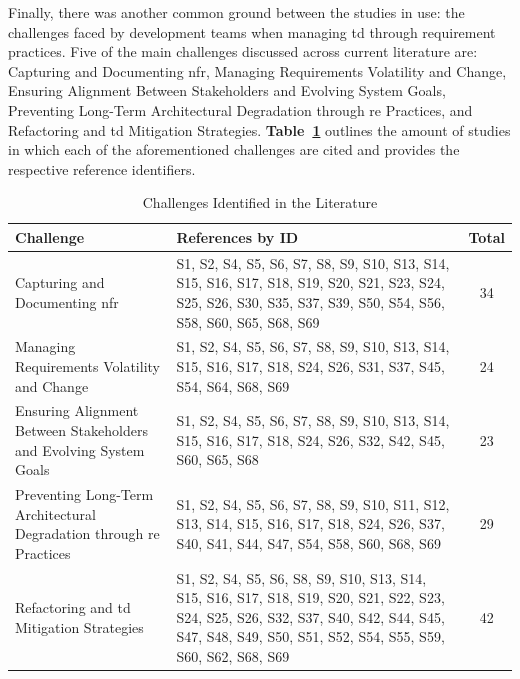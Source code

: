 \documentclass[12pt,reqno, twoside]{amsbook}
\theoremstyle{plain}
\numberwithin{equation}{chapter}
\newcommand{\tabref}[1]{\textbf{Table~\ref{#1}}}
\numberwithin{section}{chapter}
\begin{document}
\noindent Finally, there was another common ground between the studies in use: the challenges faced by development teams when managing \gls{td} through requirement practices. Five of the main challenges discussed across current literature are: Capturing and Documenting \gls{nfr}, Managing Requirements Volatility and Change, Ensuring Alignment Between Stakeholders and Evolving System Goals, Preventing Long-Term Architectural Degradation through \gls{re} Practices, and Refactoring and \gls{td} Mitigation Strategies. \tabref{tab:challenges} outlines the amount of studies in which each of the aforementioned challenges are cited and provides the respective reference identifiers.

\begin{table}[htbp]
\centering
\caption{Challenges Identified in the Literature}
\label{tab:challenges}
\begin{tabular}{|p{7cm}|p{6cm}|c|}
\hline
\textbf{Challenge} & \textbf{References by ID} & \textbf{Total} \\ \hline

Capturing and Documenting \gls{nfr} &
S1, S2, S4, S5, S6, S7, S8, S9, S10, S13, S14, S15, S16, S17, S18, S19, S20, S21, S23, S24, S25, S26, S30, S35, S37, S39, S50, S54, S56, S58, S60, S65, S68, S69
& 34 \\ \hline

Managing Requirements Volatility and Change &
S1, S2, S4, S5, S6, S7, S8, S9, S10, S13, S14, S15, S16, S17, S18, S24, S26, S31, S37, S45, S54, S64, S68, S69
& 24 \\ \hline

Ensuring Alignment Between Stakeholders and Evolving System Goals &
S1, S2, S4, S5, S6, S7, S8, S9, S10, S13, S14, S15, S16, S17, S18, S24, S26, S32, S42, S45, S60, S65, S68
& 23 \\ \hline

Preventing Long-Term Architectural Degradation through \gls{re} Practices &
S1, S2, S4, S5, S6, S7, S8, S9, S10, S11, S12, S13, S14, S15, S16, S17, S18, S24, S26, S37, S40, S41, S44, S47, S54, S58, S60, S68, S69
& 29 \\ \hline

Refactoring and \gls{td} Mitigation Strategies &
S1, S2, S4, S5, S6, S8, S9, S10, S13, S14, S15, S16, S17, S18, S19, S20, S21, S22, S23, S24, S25, S26, S32, S37, S40, S42, S44, S45, S47, S48, S49, S50, S51, S52, S54, S55, S59, S60, S62, S68, S69
& 42 \\ \hline

\end{tabular}
\end{table}
\end{document}
